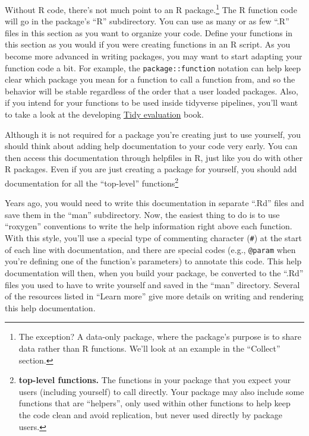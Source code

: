 \documentclass[]{tufte-book}
\begin{document}
Without R code, there's not much point to an R package.\footnote{The exception? A data-only package,
  where the package's purpose is to share data rather than R functions. We'll look at an
  example in the ``Collect'' section.} The R function code will go in the package's ``R''
subdirectory. You can use as many or as few ``.R'' files in this section as you want to
organize your code.
Define your functions in this section as you would if you were creating functions in
an R script. As you become more advanced in writing packages, you may want to start
adapting your function code a bit. For example, the \texttt{package::function} notation can
help keep clear which package you mean for a function to call a function from, and so
the behavior will be stable regardless of the order that a user loaded packages.
Also, if you intend for your functions to be used inside tidyverse pipelines, you'll
want to take a look at the developing \href{https://tidyeval.tidyverse.org/}{Tidy evaluation} book.

Although it is not required for a package you're creating just to use yourself, you
should think about adding help documentation to your code very early. You can then
access this documentation through helpfiles in R, just like you do with other R packages.
Even if you are just creating a package for yourself, you should add documentation
for all the ``top-level'' functions\footnote{\textbf{top-level functions.} The functions in your package
  that you expect your users (including yourself) to call directly. Your package may also
  include some functions that are ``helpers'', only used within other functions to help
  keep the code clean and avoid replication, but never used directly by package users.}

Years ago, you would need to write this documentation in separate ``.Rd'' files
and save them in the ``man'' subdirectory. Now, the easiest thing to do is to use
``roxygen'' conventions to write the help information right above each function.
With this style, you'll use a special type of commenting character (\texttt{\#\textquotesingle{}}) at the
start of each line with documentation, and there are special codes (e.g.,
\texttt{@param} when you're defining one of the function's parameters) to annotate this
code. This help documentation will then, when you build your package, be
converted to the ``.Rd'' files you used to have to write yourself and saved in the
``man'' directory. Several of the resources listed in ``Learn more'' give more
details on writing and rendering this help documentation.
\end{document}
